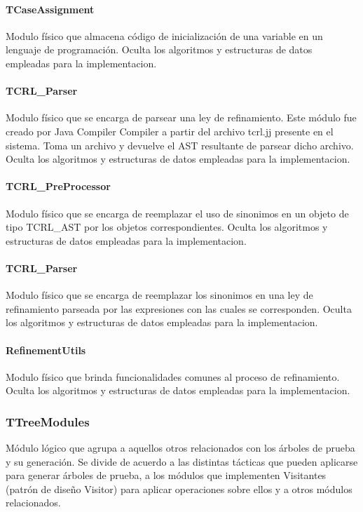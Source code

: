 \documentclass[a4paper,10pt]{report}
\begin{document}
				\paragraph{TCaseAssignment}
				Modulo físico que almacena código de inicialización de una variable en un lenguaje de programación.
				Oculta los algoritmos y estructuras de datos empleadas para la implementacion.
				\paragraph{TCRL\_Parser}
				Modulo físico que se encarga de parsear una ley de refinamiento. Este módulo fue creado por Java Compiler Compiler a partir del archivo tcrl.jj presente en el sistema.
				Toma un archivo y devuelve el AST resultante de parsear dicho archivo.
				Oculta los algoritmos y estructuras de datos empleadas para la implementacion.
				\paragraph{TCRL\_PreProcessor}
				Modulo físico que se encarga de reemplazar el uso de sinonimos en un objeto de tipo TCRL\_AST por los objetos correspondientes.
				Oculta los algoritmos y estructuras de datos empleadas para la implementacion.
				\paragraph{TCRL\_Parser}
				Modulo físico que se encarga de reemplazar los sinonimos en una ley de refinamiento parseada por las expresiones con las cuales se corresponden.
				Oculta los algoritmos y estructuras de datos empleadas para la implementacion.
				\paragraph{RefinementUtils}
				Modulo físico que brinda funcionalidades comunes al proceso de refinamiento.
				Oculta los algoritmos y estructuras de datos empleadas para la implementacion.
			\subsubsection{TTreeModules}
			Módulo lógico que agrupa a aquellos otros relacionados con los árboles de prueba y su generación. Se divide de acuerdo a las distintas tácticas que pueden aplicarse para generar árboles de prueba, a los módulos que implementen Visitantes (patrón de diseño Visitor) para aplicar operaciones sobre ellos y a otros módulos relacionados. 
\end{document}
